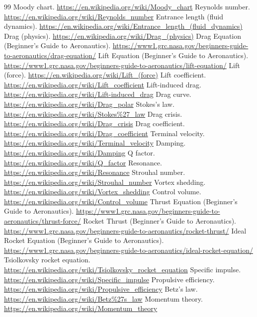 \documentclass[10pt,openany]{book}
\begin{document}
\begin{thebibliography}{99}
 Moody chart. \url{https://en.wikipedia.org/wiki/Moody_chart}
 Reynolds number. \url{https://en.wikipedia.org/wiki/Reynolds_number}
 Entrance length (fluid dynamics). \url{https://en.wikipedia.org/wiki/Entrance_length_(fluid_dynamics)}
 Drag (physics). \url{https://en.wikipedia.org/wiki/Drag_(physics)}
 Drag Equation (Beginner's Guide to Aeronautics). \url{https://www1.grc.nasa.gov/beginners-guide-to-aeronautics/drag-equation/}
 Lift Equation (Beginner's Guide to Aeronautics). \url{https://www1.grc.nasa.gov/beginners-guide-to-aeronautics/lift-equation/}
 Lift (force). \url{https://en.wikipedia.org/wiki/Lift_(force)}
 Lift coefficient. \url{https://en.wikipedia.org/wiki/Lift_coefficient}
 Lift-induced drag. \url{https://en.wikipedia.org/wiki/Lift-induced_drag}
 Drag curve. \url{https://en.wikipedia.org/wiki/Drag_polar}
 Stokes's law. \url{https://en.wikipedia.org/wiki/Stokes%27_law}
 Drag crisis. \url{https://en.wikipedia.org/wiki/Drag_crisis}
 Drag coefficient. \url{https://en.wikipedia.org/wiki/Drag_coefficient}
 Terminal velocity. \url{https://en.wikipedia.org/wiki/Terminal_velocity}
 Damping. \url{https://en.wikipedia.org/wiki/Damping}
 Q factor. \url{https://en.wikipedia.org/wiki/Q_factor}
 Resonance. \url{https://en.wikipedia.org/wiki/Resonance}
 Strouhal number. \url{https://en.wikipedia.org/wiki/Strouhal_number}
 Vortex shedding. \url{https://en.wikipedia.org/wiki/Vortex_shedding}
 Control volume. \url{https://en.wikipedia.org/wiki/Control_volume}
 Thrust Equation (Beginner's Guide to Aeronautics). \url{https://www1.grc.nasa.gov/beginners-guide-to-aeronautics/thrust-force/}
 Rocket Thrust (Beginner's Guide to Aeronautics). \url{https://www1.grc.nasa.gov/beginners-guide-to-aeronautics/rocket-thrust/}
 Ideal Rocket Equation (Beginner's Guide to Aeronautics). \url{https://www1.grc.nasa.gov/beginners-guide-to-aeronautics/ideal-rocket-equation/}
 Tsiolkovsky rocket equation. \url{https://en.wikipedia.org/wiki/Tsiolkovsky_rocket_equation}
 Specific impulse. \url{https://en.wikipedia.org/wiki/Specific_impulse}
 Propulsive efficiency. \url{https://en.wikipedia.org/wiki/Propulsive_efficiency}
 Betz's law. \url{https://en.wikipedia.org/wiki/Betz%27s_law}
 Momentum theory. \url{https://en.wikipedia.org/wiki/Momentum_theory}

\end{thebibliography}
\end{document}
